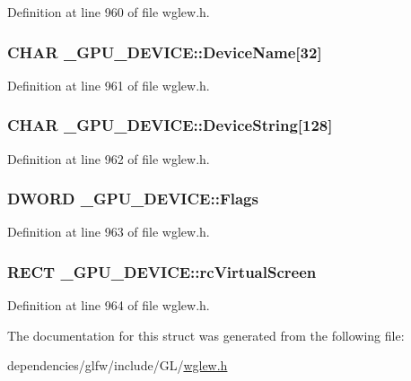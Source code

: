 Definition at line 960 of file wglew.\-h.

\hypertarget{struct___g_p_u___d_e_v_i_c_e_a604bfab61f1a2c5d1e635837d369ba14}{
\subsubsection[{Device\-Name}]{\setlength{\rightskip}{0pt plus 5cm}C\-H\-A\-R \-\_\-\-G\-P\-U\-\_\-\-D\-E\-V\-I\-C\-E\-::\-Device\-Name\mbox{[}32\mbox{]}}}\label{struct___g_p_u___d_e_v_i_c_e_a604bfab61f1a2c5d1e635837d369ba14}


Definition at line 961 of file wglew.\-h.

\hypertarget{struct___g_p_u___d_e_v_i_c_e_aff8b7920ccc85afcd6f325da6cdb0b73}{
\subsubsection[{Device\-String}]{\setlength{\rightskip}{0pt plus 5cm}C\-H\-A\-R \-\_\-\-G\-P\-U\-\_\-\-D\-E\-V\-I\-C\-E\-::\-Device\-String\mbox{[}128\mbox{]}}}\label{struct___g_p_u___d_e_v_i_c_e_aff8b7920ccc85afcd6f325da6cdb0b73}


Definition at line 962 of file wglew.\-h.

\hypertarget{struct___g_p_u___d_e_v_i_c_e_a008db9d0f5fc13a5160805f40465f14a}{
\subsubsection[{Flags}]{\setlength{\rightskip}{0pt plus 5cm}D\-W\-O\-R\-D \-\_\-\-G\-P\-U\-\_\-\-D\-E\-V\-I\-C\-E\-::\-Flags}}\label{struct___g_p_u___d_e_v_i_c_e_a008db9d0f5fc13a5160805f40465f14a}


Definition at line 963 of file wglew.\-h.

\hypertarget{struct___g_p_u___d_e_v_i_c_e_aeb573bbeb3b6c589246720ef259b9a27}{
\subsubsection[{rc\-Virtual\-Screen}]{\setlength{\rightskip}{0pt plus 5cm}R\-E\-C\-T \-\_\-\-G\-P\-U\-\_\-\-D\-E\-V\-I\-C\-E\-::rc\-Virtual\-Screen}}\label{struct___g_p_u___d_e_v_i_c_e_aeb573bbeb3b6c589246720ef259b9a27}


Definition at line 964 of file wglew.\-h.



The documentation for this struct was generated from the following file\-:\begin{DoxyCompactItemize}
\item 
dependencies/glfw/include/\-G\-L/\hyperlink{wglew_8h}{wglew.\-h}\end{DoxyCompactItemize}
